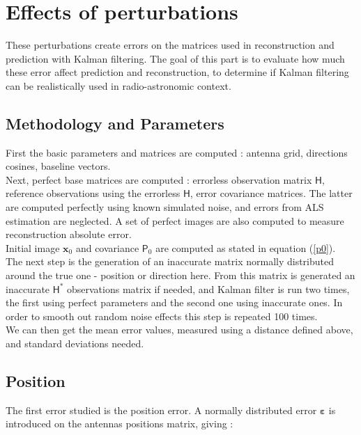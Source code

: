 \documentclass[titlepage]{article}
\renewcommand{\H}{\boldsymbol{\mathsf{H}}}
\newcommand{\x}{\boldsymbol{x}}
\renewcommand{\P}{\boldsymbol{\mathsf{P}}}
\newcommand{\vbeps}{\boldsymbol{\varepsilon}}
\begin{document}
	\section{Effects of perturbations}
	
	These perturbations create errors on the matrices used in reconstruction and prediction with Kalman filtering. The goal of this part is to evaluate how much these error affect prediction and reconstruction, to determine if Kalman filtering can be realistically used in radio-astronomic context. \\
	
	\subsection{Methodology and Parameters}

	First the basic parameters and matrices are computed : antenna grid, directions cosines, baseline vectors.\\ Next, perfect base matrices are computed : errorless observation matrix $\H$, reference observations using the errorless $\H$, error covariance matrices. The latter are computed perfectly using known simulated noise, and errors from ALS estimation are neglected. A set of perfect images are also computed to measure reconstruction absolute error.\\
	Initial image $\x_0$ and covariance $\P_0$ are computed as stated in equation (\ref{p0}).\\
	
	The next step is the generation of an inaccurate matrix normally distributed around the true one - position or direction here. From this matrix is generated an inaccurate  $\H^*$ observations matrix if needed, and Kalman filter is run two times, the first using perfect parameters and the second one using inaccurate ones. In order to smooth out random noise effects this step is repeated 100 times. \\
	
	We can then get the mean error values, measured using a distance defined above, and standard deviations needed.
	
	\subsection{Position}
	
	The first error studied is the position error. A normally distributed error $\vbeps$ is introduced on the antennas positions matrix, giving :
	
\end{document}
